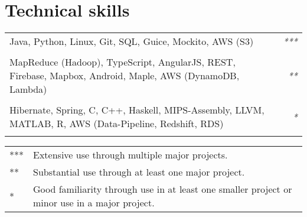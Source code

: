 \documentclass[11pt,a4paper]{article}
\begin{document}
\section*{Technical skills}
\begin{tabularx}{\textwidth}{X r}
    Java, Python, Linux, Git, SQL, Guice, Mockito, AWS (S3)
    & \textit{***} \\\\

    MapReduce (Hadoop), TypeScript, AngularJS, REST, Firebase, Mapbox, Android, Maple, AWS (DynamoDB, Lambda)
    & \textit{**} \\\\

    Hibernate, Spring, C, C++, Haskell, MIPS-Assembly, LLVM, MATLAB, R, AWS (Data-Pipeline, Redshift, RDS)
    & \textit{*} \\\\
\end{tabularx}
\begin{tiny}{}
\begin{tabular}{l l}
    *** & Extensive use through multiple major projects. \\
    ** & Substantial use through at least one major project. \\
    * & Good familiarity through use in at least one smaller project or minor use in a major project.
\end{tabular}
\end{tiny}


\end{document}
